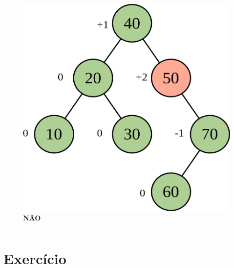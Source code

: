 \documentclass[aspectratio=169]{beamer}
\begin{document}
\begin{frame}
\begin{columns}[T]
\begin{column}{0.5\linewidth}
\begin{figure}[h]
	\includegraphics[height=0.5\paperheight]{imagens/avl03c.png}\\
	\textbf{NÃO}
\end{figure}
\end{column}
\end{columns}
\end{frame}

\section{Exercício}
\end{document}
